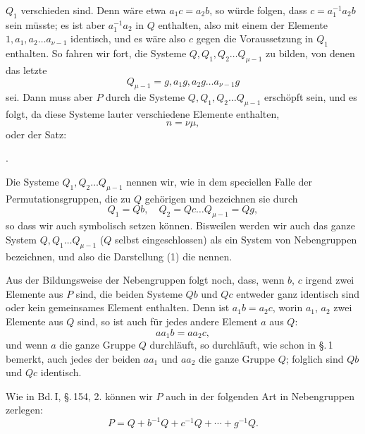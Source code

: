 $Q_1$ verschieden sind. Denn wäre etwa $a_1 c = a_2 b$, so würde folgen, dass $c = a_1^{-1} a_2 b$ sein müsste; es ist aber $a_1^{-1} a_2$ in $Q$ enthalten, also mit einem der Elemente $1, a_1, a_2 \ldots a_{\nu-1}$ identisch, und es wäre also $c$ gegen die Voraussetzung in $Q_1$ enthalten. So fahren wir fort, die Systeme $Q, Q_1, Q_2 \ldots Q_{\mu-1}$ zu bilden, von denen das letzte
\[
Q_{\mu-1} = g, a_1 g, a_2 g \ldots a_{\nu-1} g
\]
sei. Dann muss aber $P$ durch die Systeme $Q, Q_1, Q_2 \ldots Q_{\mu-1}$ erschöpft sein, und es folgt, da diese Systeme lauter verschiedene Elemente enthalten,
\[
n = \nu \mu,
\]
oder der Satz:

.\ 

Die Systeme $Q_1, Q_2 \ldots Q_{\mu-1}$ nennen wir, wie in dem speciellen Falle der Permutationsgruppen, die zu $Q$ gehörigen  und bezeichnen sie durch
\[
Q_1 = Qb, \quad Q_2 = Qc \ldots Q_{\mu-1} = Qg,
\]
so dass wir auch symbolisch
setzen können. Bisweilen werden wir auch das ganze System $Q, Q_1 \ldots Q_{\mu-1}$ ($Q$ selbst eingeschlossen) als ein System von Nebengruppen bezeichnen, und also die Darstellung (1) die  nennen.

Aus der Bildungsweise der Nebengruppen folgt noch, dass, wenn $b$, $c$ irgend zwei Elemente aus $P$ sind, die beiden Systeme $Qb$ und $Qc$ entweder ganz identisch sind oder kein gemeinsames Element enthalten. Denn ist $a_1 b = a_2 c$, worin $a_1$, $a_2$ zwei Elemente aus $Q$ sind, so ist auch für jedes andere Element $a$ aus $Q$:
\[
a a_1 b = a a_2 c,
\]
und wenn $a$ die ganze Gruppe $Q$ durchläuft, so durchläuft, wie schon in \S.\,1 bemerkt, auch jedes der beiden $a a_1$ und $a a_2$ die ganze Gruppe $Q$; folglich sind $Qb$ und $Qc$ identisch.

Wie in Bd.\,I, \S.\,154, 2. können wir $P$ auch in der folgenden Art in Nebengruppen zerlegen:
\[
P = Q + b^{-1} Q + c^{-1} Q + \cdots + g^{-1} Q.
\]
